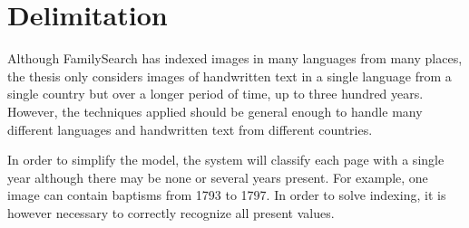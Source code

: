 \section{Delimitation}

Although FamilySearch has indexed images in many languages from many places,
the thesis only considers images of handwritten text in a single language from a single country but over a longer period of time, up to three hundred years.
However, the techniques applied should be general enough to handle many different languages and handwritten text from different countries.


In order to simplify the model,
the system will classify each page with a single year although there may be none or several years present. For example, one image can contain baptisms from 1793 to 1797. In order to solve indexing, it is however necessary to correctly recognize all present values.
